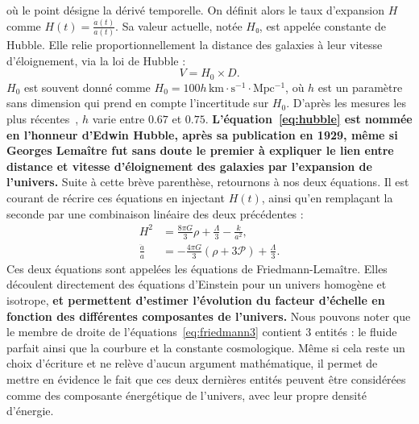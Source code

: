 \documentclass[11pt, twoside, a4paper, openright]{report}
\begin{document}
où le point désigne la dérivé temporelle. On définit alors le taux d'expansion $H$ comme $H(t) = \frac{\dot{a}(t)}{a(t)}$. Sa valeur actuelle, notée $H₀$, est appelée constante de Hubble. Elle relie proportionnellement la distance des galaxies à leur vitesse d'éloignement, via la loi de Hubble :
\begin{equation}
  \label{eq:hubble}
  V = H_0 \times D.
\end{equation}
$H_0$ est souvent donné comme $H_0 = 100 h\,\mathrm{km \cdot s^{-1} \cdot Mpc^{-1}}$, où $h$ est un paramètre sans dimension qui prend en compte l'incertitude sur $H_0$. D'après les mesures les plus récentes~\cite{CITE planck + Riess ?}, $h$ varie entre $\num{0,67}$ et $\num{0,75}$.
\textbf{L'équation~\ref{eq:hubble} est nommée en l'honneur d'Edwin Hubble, après sa publication en 1929, même si Georges Lemaître fut sans doute le premier à expliquer le lien entre distance et vitesse d'éloignement des galaxies par l'expansion de l'univers.}
Suite à cette brève parenthèse, retournons à nos deux équations. Il est courant de récrire ces équations en injectant $H(t)$, ainsi qu'en remplaçant la seconde par une combinaison linéaire des deux précédentes :
\begin{align}
  \label{eq:friedmann3}
  H^2 &= \frac{8 \pi G}{3} \rho + \frac{\Lambda}{3} - \frac{k}{a^2} ,\\
  \label{eq:friedmann4}
  \frac{\ddot{a}}{a} &= - \frac{4 \pi G}{3} (\rho + 3 \mathcal{P}) + \frac{\Lambda}{3} .
\end{align}
Ces deux équations sont appelées les équations de Friedmann-Lemaître. Elles découlent directement des équations d'Einstein pour un univers homogène et isotrope,
\textbf{et permettent d'estimer l'évolution du facteur d'échelle en fonction des différentes composantes de l'univers.}
Nous pouvons noter que le membre de droite de l'équations~\ref{eq:friedmann3} contient 3 entités : le fluide parfait ainsi que la courbure et la constante cosmologique. Même si cela reste un choix d'écriture et ne relève d'aucun argument mathématique, il permet de mettre en évidence le fait que ces deux dernières entités peuvent être considérées comme des composante énergétique de l'univers, avec leur propre densité d'énergie.
\end{document}
